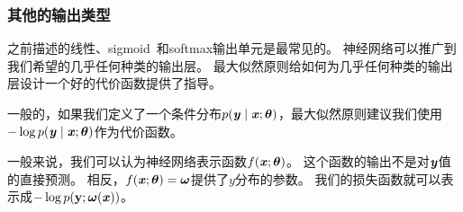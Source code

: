 
\subsubsection{其他的输出类型}
\label{sec:other_output_types}

之前描述的线性、\gls{sigmoid}~和softmax输出单元是最常见的。
神经网络可以推广到我们希望的几乎任何种类的输出层。
最大似然原则给如何为几乎任何种类的输出层设计一个好的代价函数提供了指导。

一般的，如果我们定义了一个条件分布$p(\Vy\mid\Vx; \Vtheta)$，最大似然原则建议我们使用$-\log p(\Vy\mid \Vx;\Vtheta)$作为代价函数。

一般来说，我们可以认为神经网络表示函数$f(\Vx;\Vtheta)$。
这个函数的输出不是对$\Vy$值的直接预测。
相反，$f(\Vx;\Vtheta)=\Vomega$提供了$y$分布的参数。
我们的损失函数就可以表示成$-\log p(\RVy; \Vomega(\Vx))$。

